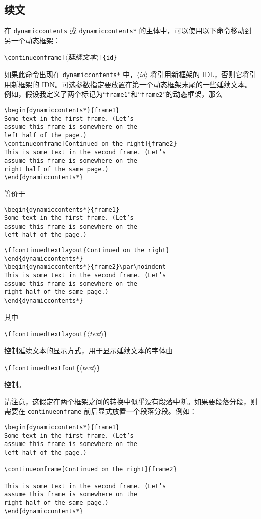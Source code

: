 \documentclass[a4paper]{book}%
\newcommand{\meta}[1]{\textnormal{\ensuremath{\langle}\makebox[0pt][l]{}\emph{#1}\makebox[0pt][l]{}\ensuremath{\rangle}}}
\newcommand{\cmd}[1]{\texttt{#1}}
\begin{document}
\subsection{续文}%
在 \cmd{dynamiccontents} 或 \cmd{dynamiccontents*} 的主体中，可以使用以下命令移动到另一个动态框架：
\begin{mdframed}
\verb|\continueonframe[|\meta{延续文本}\verb|]{id}|
\end{mdframed}
如果此命令出现在 \cmd{dynamiccontents*} 中，\meta{id} 将引用新框架的 IDL，否则它将引用新框架的 IDN。可选参数指定要放置在第一个动态框架末尾的一些延续文本。例如，假设我定义了两个标记为“\cmd{frame1}”和“\cmd{frame2}”的动态框架，那么
\begin{lstlisting}[backgroundcolor=\color{white}]
\begin{dynamiccontents*}{frame1}
Some text in the first frame. (Let’s
assume this frame is somewhere on the
left half of the page.)
\continueonframe[Continued on the right]{frame2}
This is some text in the second frame. (Let’s
assume this frame is somewhere on the
right half of the same page.)
\end{dynamiccontents*}
\end{lstlisting}
等价于
\begin{lstlisting}[backgroundcolor=\color{white}]
\begin{dynamiccontents*}{frame1}
Some text in the first frame. (Let’s
assume this frame is somewhere on the
left half of the page.)
\end{lstlisting}
\newpage
\begin{lstlisting}[backgroundcolor=\color{white}]
\ffcontinuedtextlayout{Continued on the right}
\end{dynamiccontents*}
\begin{dynamiccontents*}{frame2}\par\noindent
This is some text in the second frame. (Let’s
assume this frame is somewhere on the
right half of the same page.)
\end{dynamiccontents*}
\end{lstlisting}
其中
\begin{mdframed}
\verb|\ffcontinuedtextlayout{|\meta{text}\verb|}|
\end{mdframed}
控制延续文本的显示方式，用于显示延续文本的字体由
\begin{mdframed}
\verb|\ffcontinuedtextfont{|\meta{text}\verb|}|
\end{mdframed}
控制。

请注意，这假定在两个框架之间的转换中似乎没有段落中断。如果要段落分段，则需要在 \cmd{continueonframe} 前后显式放置一个段落分段。例如：
\begin{lstlisting}[backgroundcolor=\color{white}]
\begin{dynamiccontents*}{frame1}
Some text in the first frame. (Let’s
assume this frame is somewhere on the
left half of the page.)

\continueonframe[Continued on the right]{frame2}

This is some text in the second frame. (Let’s
assume this frame is somewhere on the
right half of the same page.)
\end{dynamiccontents*}
\end{lstlisting}
\end{document}
